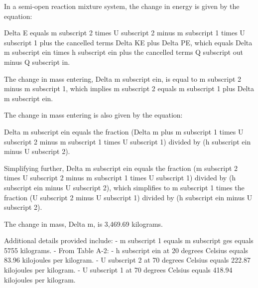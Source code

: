 In a semi-open reaction mixture system, the change in energy is given by the equation:

Delta E equals m subscript 2 times U subscript 2 minus m subscript 1 times U subscript 1 plus the cancelled terms Delta KE plus Delta PE, which equals Delta m subscript ein times h subscript ein plus the cancelled terms Q subscript out minus Q subscript in.

The change in mass entering, Delta m subscript ein, is equal to m subscript 2 minus m subscript 1, which implies m subscript 2 equals m subscript 1 plus Delta m subscript ein.

The change in mass entering is also given by the equation:

Delta m subscript ein equals the fraction (Delta m plus m subscript 1 times U subscript 2 minus m subscript 1 times U subscript 1) divided by (h subscript ein minus U subscript 2).

Simplifying further, Delta m subscript ein equals the fraction (m subscript 2 times U subscript 2 minus m subscript 1 times U subscript 1) divided by (h subscript ein minus U subscript 2), which simplifies to m subscript 1 times the fraction (U subscript 2 minus U subscript 1) divided by (h subscript ein minus U subscript 2).

The change in mass, Delta m, is 3,469.69 kilograms.

Additional details provided include:
- m subscript 1 equals m subscript ges equals 5755 kilograms.
- From Table A-2:
  - h subscript ein at 20 degrees Celsius equals 83.96 kilojoules per kilogram.
  - U subscript 2 at 70 degrees Celsius equals 222.87 kilojoules per kilogram.
  - U subscript 1 at 70 degrees Celsius equals 418.94 kilojoules per kilogram.